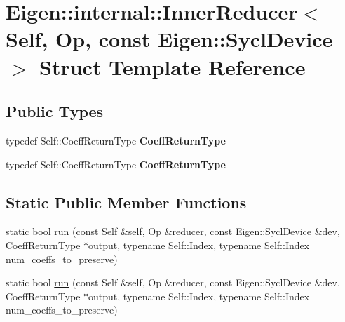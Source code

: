 \hypertarget{struct_eigen_1_1internal_1_1_inner_reducer_3_01_self_00_01_op_00_01const_01_eigen_1_1_sycl_device_01_4}{}\section{Eigen\+:\+:internal\+:\+:Inner\+Reducer$<$ Self, Op, const Eigen\+:\+:Sycl\+Device $>$ Struct Template Reference}
\label{struct_eigen_1_1internal_1_1_inner_reducer_3_01_self_00_01_op_00_01const_01_eigen_1_1_sycl_device_01_4}
\subsection*{Public Types}
\begin{DoxyCompactItemize}
\item 
\mbox{\label{struct_eigen_1_1internal_1_1_inner_reducer_3_01_self_00_01_op_00_01const_01_eigen_1_1_sycl_device_01_4_acef5848945739203d911256e0b846ba5}} 
typedef Self\+::\+Coeff\+Return\+Type {\bfseries Coeff\+Return\+Type}
\item 
\mbox{\label{struct_eigen_1_1internal_1_1_inner_reducer_3_01_self_00_01_op_00_01const_01_eigen_1_1_sycl_device_01_4_acef5848945739203d911256e0b846ba5}} 
typedef Self\+::\+Coeff\+Return\+Type {\bfseries Coeff\+Return\+Type}
\end{DoxyCompactItemize}
\subsection*{Static Public Member Functions}
\begin{DoxyCompactItemize}
\item 
static bool \hyperlink{struct_eigen_1_1internal_1_1_inner_reducer_3_01_self_00_01_op_00_01const_01_eigen_1_1_sycl_device_01_4_a471bb175078f166e0d5c4040fc4494d9}{run} (const Self \&self, Op \&reducer, const Eigen\+::\+Sycl\+Device \&dev, Coeff\+Return\+Type $\ast$output, typename Self\+::\+Index, typename Self\+::\+Index num\+\_\+coeffs\+\_\+to\+\_\+preserve)
\item 
static bool \hyperlink{struct_eigen_1_1internal_1_1_inner_reducer_3_01_self_00_01_op_00_01const_01_eigen_1_1_sycl_device_01_4_a471bb175078f166e0d5c4040fc4494d9}{run} (const Self \&self, Op \&reducer, const Eigen\+::\+Sycl\+Device \&dev, Coeff\+Return\+Type $\ast$output, typename Self\+::\+Index, typename Self\+::\+Index num\+\_\+coeffs\+\_\+to\+\_\+preserve)
\end{DoxyCompactItemize}
